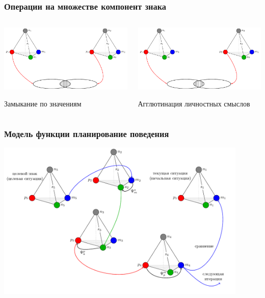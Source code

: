 \documentclass[default]{beamer}
\begin{document}
	\begin{frame}
		\frametitle{Операции на множестве компонент знака}
		
		\begin{columns}
			\begin{column}{0.5\textwidth}
				\centering
				\includegraphics[page=7,width=\textwidth]{signs/sign_relations}
				\par\bigskip
				Замыкание по значениям
			\end{column}
			\begin{column}{0.5\textwidth}
				\centering
				\includegraphics[page=8,width=\textwidth]{signs/sign_relations}
				\par\bigskip
				Агглютинация личностных смыслов
			\end{column}
		\end{columns}
	\end{frame}	
		
	\begin{frame}
		\frametitle{Модель функции планирование поведения}
		\centering
		\includegraphics[width=0.9\textwidth]{algo/ru/plan_alg_ru}
		\nocite{*}
		\printbibliography[keyword={signb}, resetnumbers=true]
	\end{frame}	
	
\end{document}
